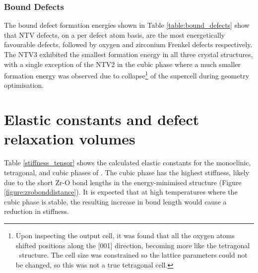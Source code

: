 %


\subsubsection*{Bound Defects}
The bound defect formation energies shown in Table \ref{table:bound_defects} show that NTV defects, on a per defect atom basis, are the most energetically favourable defects, followed by oxygen and zirconium Frenkel defects respectively. The NTV3 exhibited the smallest formation energy in all three crystal structures, with a single exception of the NTV2 in the cubic phase where a much smaller formation energy was observed due to collapse\footnote{Upon inspecting the output cell, it was found that all the oxygen atoms shifted positions along the [001] direction, becoming more like the tetragonal \zirconia\ structure. The cell size was constrained so the lattice parameters could not be changed, so this was not a true tetragonal cell.} of the supercell during geometry optimisation.

\section{Elastic constants and defect relaxation volumes}

Table \ref{stiffness_tensor} shows the calculated elastic constants for the monoclinic, tetragonal, and cubic phases of \zirconia . The cubic phase has the highest stiffness, likely due to the short Zr-O bond lengths in the energy-minimised structure (Figure \ref{figure:zrobonddistance}). It is expected that at high temperatures where the cubic phase is stable, the resulting increase in bond length would cause a reduction in stiffness. 

